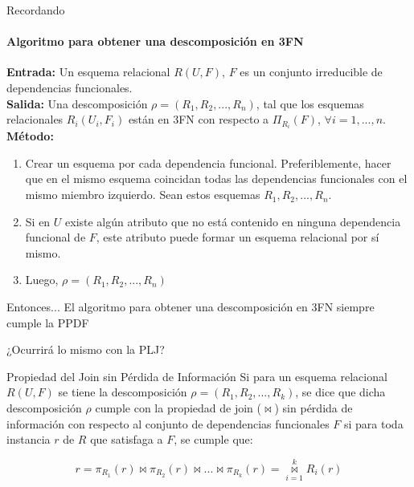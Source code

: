 \begin{frame}{Recordando}
    \framesubtitle{Algoritmo para obtener una descomposici\'on en 3FN}
    \textbf{Entrada:} Un esquema relacional $R(U,F)$, $F$ es un conjunto irreducible de dependencias funcionales.\\
    \textbf{Salida:} Una descomposici\'on $\rho = (R_1,R_2,...,R_n)$, tal que
    los esquemas relacionales $R_i(U_i,F_i)$ est\'an en 3FN con respecto
    a $\Pi_{R_i}(F)$, $\forall i = 1,...,n$.\\

    \textbf{M\'etodo:}\begin{enumerate}
        \item Crear un esquema por cada dependencia funcional. Preferiblemente, hacer que en el mismo esquema coincidan todas las dependencias funcionales con el mismo miembro izquierdo. Sean estos esquemas $R_1, R_2, ..., R_n$.
        \item Si en $U$ existe alg\'un atributo que no est\'a contenido en ninguna dependencia
        funcional de $F$, este atributo puede formar un esquema relacional por s\'i mismo.
        \item Luego, $\rho = (R_1,R_2,...,R_n)$
    \end{enumerate}
\end{frame}

\begin{frame}{Entonces...}
    \centering
    El algoritmo para obtener una descomposici\'on en 3FN siempre cumple la PPDF
    \vspace{5mm}

    \centering
    ¿Ocurrir\'a lo mismo con la PLJ?
\end{frame}

\begin{frame}{Propiedad del Join sin P\'erdida de Informaci\'on}
    Si para un esquema relacional $R(U,F)$ se tiene la descomposici\'on
    $\rho = (R_1,R_2,...,R_k)$, se dice que dicha descomposici\'on $\rho$ cumple
    con la propiedad de join ($\Join$) sin p\'erdida de informaci\'on con respecto al
    conjunto de dependencias funcionales $F$ si para toda instancia $r$ de $R$ que
    satisfaga a $F$, se cumple que:
    
    $$
        r = \pi_{R_1}(r) \Join \pi_{R_2}(r) \Join ... \Join \pi_{R_k}(r) = \overset{k}{\underset{i=1}{\Join }}R_i(r)
    $$
    
    \vspace{5mm}
    
\end{frame}

